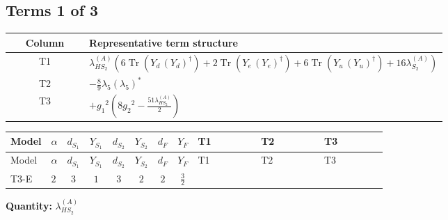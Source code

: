 \documentclass[8pt]{article}
\begin{document}
\begin{landscape}
\subsection*{Terms 1 of 3}
\begin{center}
\begin{tabular}{@{}c >{\raggedright\arraybackslash}p{0.82\linewidth}@{}}
\toprule
Column & Representative term structure \\
\midrule
T1 & \(\displaystyle {\lambda_{HS_2}^{(A)}} (6 \operatorname{Tr}\!\left({Y_d}\,\left({Y_d}\right)^{\dagger}\right)+2 \operatorname{Tr}\!\left({Y_e}\,\left({Y_e}\right)^{\dagger}\right)+6 \operatorname{Tr}\!\left({Y_u}\,\left({Y_u}\right)^{\dagger}\right)+16 {\lambda_{S_2}^{(A)}})\) \\
\midrule
T2 & \(\displaystyle -\frac{8}{9} {\lambda_5} \left({\lambda_5}\right)^{*}\) \\
\midrule
T3 & \(\displaystyle +{g_1}^2 \left(8 {g_2}^2-\frac{51 {\lambda_{HS_2}^{(A)}}}{2}\right)\) \\
\midrule
\bottomrule
\end{tabular}
\end{center}
\smallskip
\tiny
\begin{longtable}{@{}llcccccc >{\raggedright\arraybackslash}p{0.21\linewidth} >{\raggedright\arraybackslash}p{0.21\linewidth} >{\raggedright\arraybackslash}p{0.21\linewidth}@{}}
\toprule
Model & $\alpha$ & $d_{S_1}$ & $Y_{S_1}$ & $d_{S_2}$ & $Y_{S_2}$ & $d_F$ & $Y_F$ & T1 & T2 & T3 \\
\midrule
\endfirsthead
\toprule
Model & $\alpha$ & $d_{S_1}$ & $Y_{S_1}$ & $d_{S_2}$ & $Y_{S_2}$ & $d_F$ & $Y_F$ & T1 & T2 & T3 \\
\midrule
\endhead
T3-E & $2$ & $3$ & $1$ & $3$ & $2$ & $2$ & $\frac{3}{2}$ & \scriptsize\adjustbox{max width=\linewidth}{$\begin{gathered} {\lambda_{HS_2}^{(A)}} (6 \operatorname{Tr}\!\left({Y_d}\,\left({Y_d}\right)^{\dagger}\right)+2 \operatorname{Tr}\!\left({Y_e}\,\left({Y_e}\right)^{\dagger}\right)+6 \operatorname{Tr}\!\left({Y_u}\,\left({Y_u}\right)^{\dagger}\right)+16 {\lambda_{S_2}^{(A)}})\end{gathered}$} & \scriptsize\adjustbox{max width=\linewidth}{$\begin{gathered} -\frac{8}{9} {\lambda_5} \left({\lambda_5}\right)^{*}\end{gathered}$} & \scriptsize\adjustbox{max width=\linewidth}{$\begin{gathered} +{g_1}^2 \left(8 {g_2}^2-\frac{51 {\lambda_{HS_2}^{(A)}}}{2}\right)\end{gathered}$} \\
\midrule
\bottomrule
\end{longtable}
\clearpage
\noindent\textbf{Quantity: }$\lambda_{HS_2}^{(A)}$\par\smallskip

\end{landscape}
\end{document}
